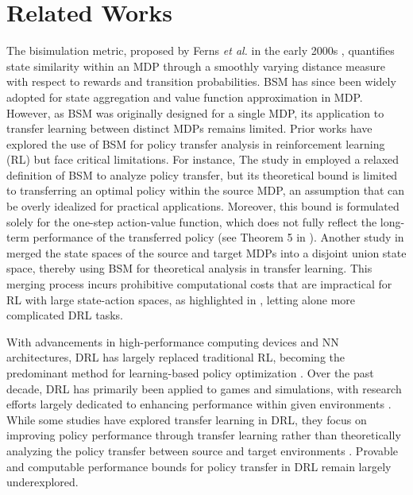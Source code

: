 \section{Related Works}
The bisimulation metric, proposed by Ferns \textit{et al.} in the early 2000s \cite{BSM}, quantifies state similarity within an MDP through a smoothly varying distance measure with respect to rewards and transition probabilities. BSM has since been widely adopted for state aggregation \cite{Li2006TowardsAU,LeLan2021} and value function approximation \cite{NEURIPS2021_256bf8e6} in MDP. However, as BSM was originally designed for a single MDP, its application to transfer learning between distinct MDPs remains limited. Prior works have explored the use of BSM for policy transfer analysis in reinforcement learning (RL) but face critical limitations. For instance, The study in \cite{castro2010using} employed a relaxed definition of BSM to analyze policy transfer, but its theoretical bound is limited to transferring an optimal policy within the source MDP, an assumption that can be overly idealized for practical applications. Moreover, this bound is formulated solely for the one-step action-value function, which does not fully reflect the long-term performance of the transferred policy (see Theorem 5 in \cite{castro2010using}). Another study in \cite{phillips2006knowledge} merged the state spaces of the source and target MDPs into a disjoint union state space, thereby using BSM for theoretical analysis in transfer learning. This merging process incurs prohibitive computational costs that are impractical for RL with large state-action spaces, as highlighted in \cite{taylor2009transfer}, letting alone more complicated DRL tasks.
\setlength{\parskip}{0\baselineskip}

With advancements in high-performance computing devices and NN architectures, DRL has largely replaced traditional RL, becoming the predominant method for learning-based policy optimization \cite{9904958}. Over the past decade, DRL has primarily been applied to games and simulations, with research efforts largely dedicated to enhancing performance within given environments \cite{silver2016mastering,berner2019dota}. While some studies have explored transfer learning in DRL, they focus on improving policy performance through transfer learning rather than theoretically analyzing the policy transfer between source and target environments \cite{10172347}. Provable and computable performance bounds for policy transfer in DRL remain largely underexplored.

